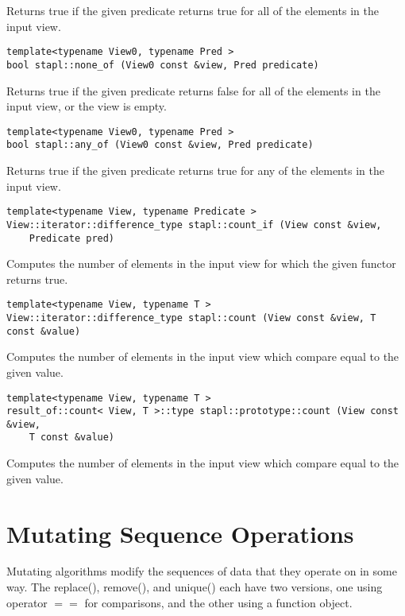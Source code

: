 Returns true if the given predicate returns true for all of the elements in the input view.

\begin{verbatim}
template<typename View0, typename Pred >
bool stapl::none_of (View0 const &view, Pred predicate)
\end{verbatim}

Returns true if the given predicate returns false for all of the elements in the input view, or the view is empty.

\begin{verbatim}
template<typename View0, typename Pred >
bool stapl::any_of (View0 const &view, Pred predicate)
\end{verbatim}

Returns true if the given predicate returns true for any of the elements in the input view.

\begin{verbatim}
template<typename View, typename Predicate >
View::iterator::difference_type stapl::count_if (View const &view,
    Predicate pred)
\end{verbatim}

Computes the number of elements in the input view for which the given functor returns true.

\begin{verbatim}
template<typename View, typename T >
View::iterator::difference_type stapl::count (View const &view, T const &value)
\end{verbatim}

Computes the number of elements in the input view which compare equal to the given value.

\begin{verbatim}
template<typename View, typename T >
result_of::count< View, T >::type stapl::prototype::count (View const &view,
    T const &value)
\end{verbatim}

Computes the number of elements in the input view which compare equal to the given value.


\pagebreak

\section{Mutating Sequence Operations} \label{sec-mutseq-alg}

Mutating algorithms modify the sequences of data that they operate on in some way. The replace(), remove(), and unique() each have two versions, one using operator $==$ for comparisons, and the other using a function object.

